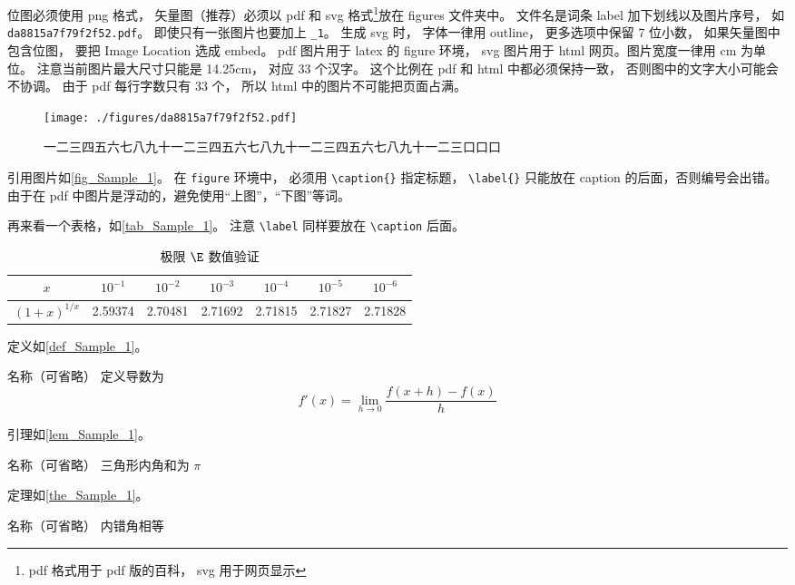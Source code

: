 位图必须使用 png 格式， 矢量图（推荐）必须以 pdf 和 svg 格式\footnote{pdf 格式用于 pdf 版的百科， svg 用于网页显示}放在 figures 文件夹中。 文件名是词条 label 加下划线以及图片序号， 如 \verb|da8815a7f79f2f52.pdf|。 即使只有一张图片也要加上 \verb|_1|。 生成 svg 时， 字体一律用 outline， 更多选项中保留 7 位小数， 如果矢量图中包含位图， 要把 Image Location 选成 embed。 pdf 图片用于 latex 的 figure 环境， svg 图片用于 html 网页。图片宽度一律用 cm 为单位。 注意当前图片最大尺寸只能是 14.25cm， 对应 33 个汉字。 这个比例在 pdf 和 html 中都必须保持一致， 否则图中的文字大小可能会不协调。 由于 pdf 每行字数只有 33 个， 所以 html 中的图片不可能把页面占满。
\begin{figure}[ht]
\centering
\texttt{[image: ./figures/da8815a7f79f2f52.pdf]}
\caption{一二三四五六七八九十一二三四五六七八九十一二三四五六七八九十一二三口口口} \label{fig_Sample_1}
\end{figure}
引用图片如\autoref{fig_Sample_1}。 在 \verb|figure| 环境中， 必须用 \verb|\caption{}| 指定标题， \verb|\label{}| 只能放在 caption 的后面，否则编号会出错。由于在 pdf 中图片是浮动的，避免使用“上图”，“下图”等词。

再来看一个表格，如\autoref{tab_Sample_1}。 注意 \verb|\label| 同样要放在 \verb|\caption| 后面。
\begin{table}[ht]
\centering
\caption{极限 $\E$ 数值验证}\label{tab_Sample_1}
\begin{tabular}{|c|c|c|c|c|c|c|}
\hline
$x$ & ${10^{ - 1}}$ & ${10^{ - 2}}$ & ${10^{ - 3}}$ & ${10^{ - 4}}$ & ${10^{ - 5}}$ & ${10^{ - 6}}$ \\
\hline
$(1 + x)^{1/x}$ & 2.59374 & 2.70481 & 2.71692 & 2.71815 & 2.71827 & 2.71828 \\
\hline
\end{tabular}
\end{table}

定义如\autoref{def_Sample_1}。
\begin{definition}{名称（可省略）}\label{def_Sample_1}
定义导数为
\begin{equation}
f'(x) = \lim_{h \to 0} \frac{f(x + h) - f(x)}{h}
\end{equation}
\end{definition}

引理如\autoref{lem_Sample_1}。
\begin{lemma}{名称（可省略）}\label{lem_Sample_1}
三角形内角和为 $\pi$
\end{lemma}

定理如\autoref{the_Sample_1}。
\begin{theorem}{名称（可省略）}\label{the_Sample_1}
内错角相等
\end{theorem}

